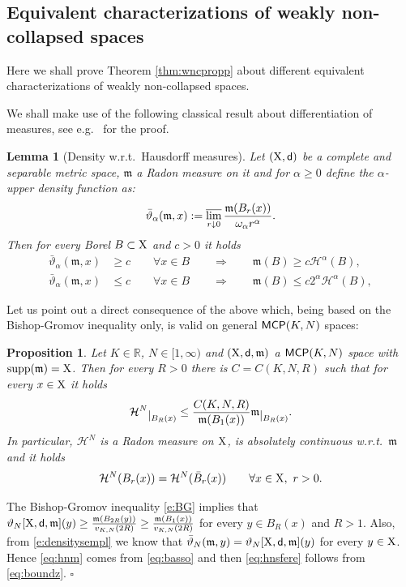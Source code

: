 \documentclass[reqno,11pt]{article}
\numberwithin{equation}{section}
\newcommand{\R}{\mathbb{R}}
\newcommand{\mm}{{\mbox{\boldmath$m$}}}
\newcommand{\sfd}{{\sf d}}
\newcommand{\supp}{\mathop{\rm supp}\nolimits}   %
\newcommand{\restr}[1]{\lower3pt\hbox{$|_{#1}$}}
\newcommand{\lims}{\varlimsup}
\renewcommand{\mm}{\mathfrak m}                                %
\renewenvironment{proof}{\removelastskip\par\medskip   %
\noindent{\em Proof} \rm}{\penalty-20\null\hfill$\square$\par\medbreak}
\newtheorem{lemma}[theorem]{Lemma}
\newtheorem{proposition}[theorem]{Proposition}
\newcommand{\X}{{\rm X}}
\newcommand{\MCP}{{\sf MCP}}
\newcommand{\HH}{{\mathcal H}}
\begin{document}
\subsection{Equivalent characterizations of weakly non-collapsed spaces}
Here we shall prove Theorem \ref{thm:wncpropp} about different equivalent characterizations of weakly non-collapsed spaces.

We shall make use of the  following classical result about differentiation of measures, see e.g.\ \cite[Theorem 2.4.3]{AmbrosioTilli04} for the proof.
\begin{lemma}[Density w.r.t.\ Hausdorff measures]\label{le:AT} Let $(\X,\sfd)$ be a complete and separable metric space, $\mm$ a Radon measure on it and for $\alpha\geq 0$ define the $\alpha$-upper density function as:
\[
\bar\vartheta_\alpha(\mm,x):=\lims_{r\downarrow0}\frac{\mm(B_r(x))}{\omega_\alpha r^\alpha}.
\]
Then for every Borel $B\subset \X$ and $c>0$ it holds
\begin{align}
\label{eq:basso}
\bar\vartheta_\alpha(\mm,x)&\geq c\qquad\forall x\in B\qquad\Rightarrow\qquad \mm(B)\geq c\HH^\alpha(B),\\
\label{eq:aalto}
\bar\vartheta_\alpha(\mm,x)&\leq c\qquad\forall x\in B\qquad\Rightarrow\qquad \mm(B)\leq c2^\alpha\HH^\alpha(B),
\end{align}
\end{lemma}
Let us point out a direct consequence of the above which, being based on the Bishop-Gromov inequality only, is valid on general $\MCP(K,N)$ spaces:
\begin{proposition}\label{prop:basehn}
Let $K\in\R$, $N\in[1,\infty)$ and  $(\X,\sfd,\mm)$  a $\MCP(K,N)$ space with $\supp(\mm)=\X$. Then for every $R>0$ there is $C=C(K,N,R)$ such that for every $x\in\X$   it holds
\begin{equation}
\label{eq:hnm}
\HH^N\restr{B_R(x)}\leq\frac{ C(K,N,R)}{\mm(B_1(x))}\mm\restr{B_R(x)}.
\end{equation}
In particular, $\HH^N$ is a Radon measure on $\X$, is absolutely continuous w.r.t.\ $\mm$ and it holds
\begin{equation}
\label{eq:hnsfere}
\HH^N(B_r(x))=\HH^N(\bar B_r(x))\qquad\forall x\in\X,\ r>0.
\end{equation} 
\end{proposition}
\begin{proof} The Bishop-Gromov inequality \eqref{e:BG} implies that $\vartheta_{N}[\X,\sfd,\mm](y)\geq \frac{\mm(B_{2R}(y))}{v_{K,N}(2R)}\geq  \frac{\mm(B_{1}(x))}{v_{K,N}(2R)}$ for every $y\in B_R(x)$ { and  $R>1$. Also,}  from \eqref{e:densitysempl} we know that $\bar\vartheta_N(\mm,y)=\vartheta_{N}[\X,\sfd,\mm](y)$ for every $y\in\X$. Hence \eqref{eq:hnm}  comes from  \eqref{eq:basso} and then \eqref{eq:hnsfere} follows from \eqref{eq:boundz}.
\end{proof}
\end{document}
